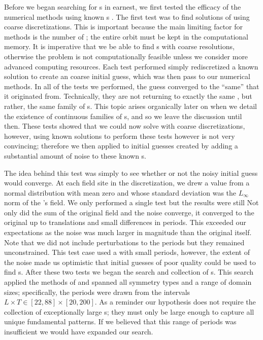Before we began searching for {\po}s in earnest, we first
tested the efficacy of the {\spt} numerical methods %
using known {\po}s .
The first test was to find solutions of  using coarse {\spt} discretizations.
This is important because the main limiting factor
for {\spt} methods is the number of {\cdofs}; the entire orbit must be
kept in the computational memory. It is imperative that we be able to
find {\po}s with coarse resolutions, otherwise the problem is not computationally
feasible unless we consider more advanced computing resources. 
Each test performed simply rediscretized a known solution to create an coarse
initial guess, which was then pass to our numerical methods.
In all of the tests we performed, the guess converged to the 
``same'' {\po} that it originated from.
Technically, they are not returning
to exactly the same {\po}, but rather, the same family of {\po}s. This
topic arises organically later on when we detail the existence
of continuous families of {\fpo}s, and so we leave the discussion until then.
These tests showed that we could now solve  with coarse
discretizations, however, using known solutions to perform these tests however
is not very convincing; therefore we then applied
to initial guesses created by adding a substantial amount of noise
to these known {\po}s.

The idea behind this test was simply to see whether or not
the noisy initial guess would converge. 
At each field site in the discretization, we drew a value from a
normal distribution with mean zero and whose standard deviation was the 
$L_{\infty}$ norm of the {\po}'s field. We only performed a single test
but the results were still  Not only did the 
sum of the original field and the noise converge, it converged to the original {\po}
up to translations and small differences in periods.
This exceeded our expectations as the noise was much larger in magnitude
than the original {\po} itself.
Note that we did not include perturbations to the periods but
they remained unconstrained. This test case used a {\po}
with small periods, however, the extent of the noise made us
optimistic that initial guesses of poor quality could be used to find {\po}s.
After these two tests we began the search and collection of {\po}s.
This search applied the methods of  and
spanned all symmetry types and a range of domain sizes; specifically,
the periods were drawn from the intervals
$L \times T \in [22, 88] \times [20, 200]$.
As a reminder our hypothesis does not require the collection of exceptionally large {\po}s;
they must only be large enough to capture all unique fundamental patterns. If we believed
that this range of periods was insufficient we would have expanded our
search.

